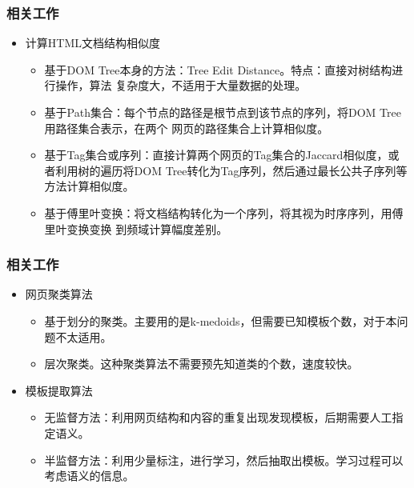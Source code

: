 \documentclass[11pt,presentation]{beamer}
\begin{document}
\begin{frame}
\frametitle{相关工作}
\label{sec-1-3}
\begin{itemize}

\item 计算HTML文档结构相似度
\label{sec-1-3-1}%
\begin{itemize}
\item 基于DOM Tree本身的方法：Tree Edit Distance\cite{1}。特点：直接对树结构进行操作，算法
     复杂度大，不适用于大量数据的处理。
\item 基于Path集合：每个节点的路径是根节点到该节点的序列，将DOM Tree用路径集合表示，在两个
     网页的路径集合上计算相似度\cite{4,5,6}。
\item 基于Tag集合或序列：直接计算两个网页的Tag集合的Jaccard相似度，或者利用树的遍历将DOM
     Tree转化为Tag序列，然后通过最长公共子序列等方法计算相似度\cite{4,5,8}。
\item 基于傅里叶变换：将文档结构转化为一个序列，将其视为时序序列，用傅里叶变换变换
     到频域计算幅度差别\cite{4,7}。
\end{itemize}

\end{itemize} %
\end{frame}
\begin{frame}
\frametitle{相关工作}
\label{sec-1-4}
\begin{itemize}

\item 网页聚类算法
\label{sec-1-4-1}%
\begin{itemize}
\item 基于划分的聚类。主要用的是k-medoids，但需要已知模板个数，对于本问题不太适用。
\item 层次聚类。这种聚类算法不需要预先知道类的个数，速度较快。
\end{itemize}


\item 模板提取算法
\label{sec-1-4-2}%
\begin{itemize}
\item 无监督方法：利用网页结构和内容的重复出现发现模板，后期需要人工指定语义\cite{2}。
\item 半监督方法：利用少量标注，进行学习，然后抽取出模板。学习过程可以考虑语义的信息\cite{3}。
\end{itemize}

\end{itemize} %
\end{frame}
\end{document}
